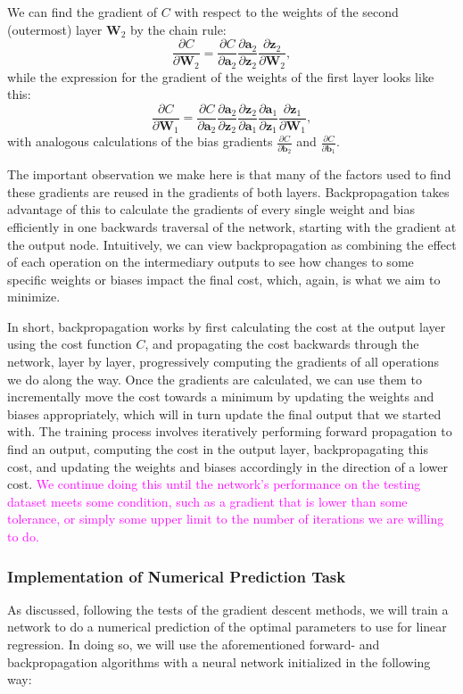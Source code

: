 We can find the gradient of $C$ with respect to the weights of the second (outermost) layer $\mathbf W_2$ by the chain rule:
\[\frac{\partial C}{\partial \mathbf W_2} = \frac{\partial C}{\partial \boldsymbol a_2}
\frac{\partial \boldsymbol a_2}{\partial \boldsymbol z_2}
\frac{\partial \boldsymbol z_2}{\partial \mathbf W_2},\]
while the expression for the gradient of the weights of the first layer looks like this:
\[\frac{\partial C}{\partial \mathbf W_1} = \frac{\partial C}{\partial \boldsymbol a_2}
\frac{\partial \boldsymbol a_2}{\partial \boldsymbol z_2}
\frac{\partial \boldsymbol z_2}{\partial \boldsymbol a_1}
\frac{\partial \boldsymbol a_1}{\partial \boldsymbol z_1}
\frac{\partial \boldsymbol z_1}{\partial \mathbf W_1},\]
with analogous calculations of the bias gradients $\frac{\partial C}{\partial \boldsymbol b_2}$ and $\frac{\partial C}{\partial \boldsymbol b_1}$. 

The important observation we make here is that many of the factors used to find these gradients are reused in the gradients of both layers. Backpropagation takes advantage of this to calculate the gradients of every single weight and bias efficiently in one backwards traversal of the network, starting with the gradient at the output node. Intuitively, we can view backpropagation as combining the effect of each operation on the intermediary outputs to see how changes to some specific weights or biases impact the final cost, which, again, is what we aim to minimize. 

In short, backpropagation works by first calculating the cost at the output layer using the cost function $C$, and propagating the cost backwards through the network, layer by layer, progressively computing the gradients of all operations we do along the way. Once the gradients are calculated, we can use them to incrementally move the cost towards a minimum by updating the weights and biases appropriately, which will in turn update the final output that we started with. The training process involves iteratively performing forward propagation to find an output, computing the cost in the output layer, backpropagating this cost, and updating the weights and biases accordingly in the direction of a lower cost. \textcolor{magenta}{We continue doing this until the network's performance on the testing dataset meets some condition, such as a gradient that is lower than some tolerance, or simply some upper limit to the number of iterations we are willing to do.}

\subsubsection{Implementation of Numerical Prediction Task} %
As discussed, following the tests of the gradient descent methods, we will train a network to do a numerical prediction of the optimal parameters to use for linear regression. In doing so, we will use the aforementioned forward- and backpropagation algorithms with a neural network initialized in the following way:\\

